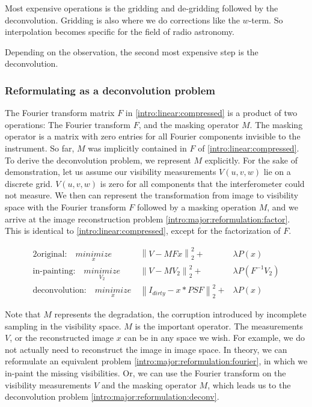 Most expensive operations is the gridding and de-gridding followed by the deconvolution. Gridding is also where we do corrections like the $w$-term. So interpolation becomes specific for the field of radio astronomy.

Depending on the observation, the second most expensive step is the deconvolution.

\subsubsection{Reformulating as a deconvolution problem}\label{intro:major:reformulation}
The Fourier transform matrix $F$ in \eqref{intro:linear:compressed} is a product of two operations: The Fourier transform $F$, and the masking operator $M$. The masking operator is a matrix with zero entries for all Fourier components invisible to the instrument. So far, $M$ was implicitly contained in $F$ of \eqref{intro:linear:compressed}. To derive the deconvolution problem, we represent $M$ explicitly. For the sake of demonstration, let us assume our visibility measurements $V(u, v ,w)$ lie on a discrete grid. $V(u, v, w)$ is zero for all components that the interferometer could not measure. We then can represent the transformation from image to visibility space with the Fourier transform $F$ followed by a masking operation $M$, and we arrive at the image reconstruction problem \eqref{intro:major:reformulation:factor}. This is identical to \eqref{intro:linear:compressed}, except for the factorization of $F$.

\begin{alignat}{2}
\text{original:} \quad \underset{x}{minimize}\:& \left \| V - M Fx \right \|_2^2 + &\lambda P(x) \label{intro:major:reformulation:factor}\\ 
\text{in-painting:} \quad\underset{V_2}{minimize}\:& \left \| V - M V_2 \right \|_2^2 + &\lambda P(F^{-1}V_2) \label{intro:major:reformulation:fourier} \\
\text{deconvolution:} \quad \underset{x}{minimize}\:& \left \| I_{dirty} - x * PSF \right \|_2^2 + &\lambda P(x) \label{intro:major:reformulation:deconv}
\end{alignat}

Note that $M$ represents the degradation, the corruption introduced by incomplete sampling in the visibility space. $M$ is the important operator. The measurements $V$, or the reconstructed image $x$ can be in any space we wish. For example, we do not actually need to reconstruct the image in image space. In theory, we can reformulate an equivalent problem \eqref{intro:major:reformulation:fourier}, in which we in-paint the missing visibilities. Or, we can use the Fourier transform on the visibility measurements $V$ and the masking operator $M$, which leads us to the deconvolution problem \eqref{intro:major:reformulation:deconv}. 

